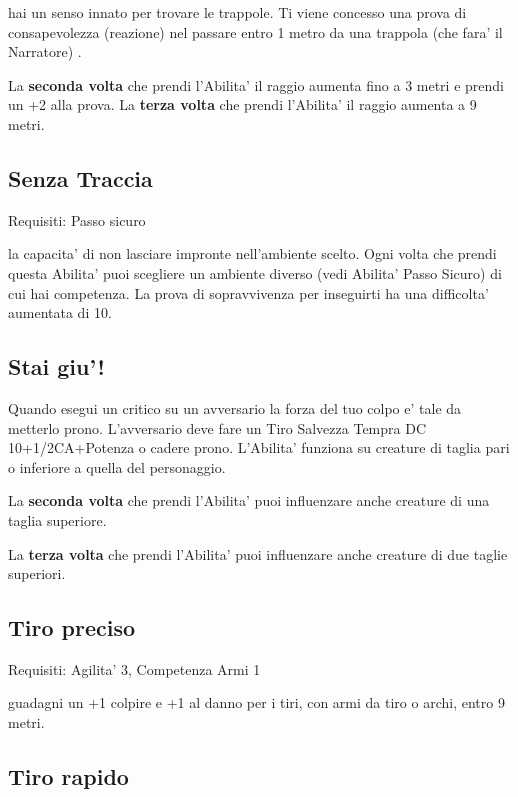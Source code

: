 \documentclass[a4paper,11pt,twoside,openany]{book}
\begin{document}
	hai un senso innato per trovare le trappole. Ti viene concesso una prova di consapevolezza (reazione) nel passare entro 1 metro da una trappola (che fara' il Narratore) .
	
	La \textbf{seconda volta} che prendi l'Abilita' il raggio aumenta fino a 3 metri e prendi un +2 alla prova. La \textbf{terza volta} che prendi l'Abilita' il raggio aumenta a 9 metri.
	
	\subsection{Senza Traccia}
	
	Requisiti: Passo sicuro
	
	la capacita' di non lasciare impronte nell'ambiente scelto. Ogni volta che prendi questa Abilita' puoi scegliere un ambiente diverso (vedi Abilita' Passo Sicuro) di cui hai competenza. La prova di sopravvivenza per inseguirti ha una difficolta' aumentata di 10.
	
	\subsection{Stai giu'!}
	
	Quando esegui un critico su un avversario la forza del tuo colpo e' tale da metterlo prono. L'avversario deve fare un Tiro Salvezza Tempra DC 10+1/2CA+Potenza o cadere prono. L'Abilita' funziona su creature di taglia pari o inferiore a quella del personaggio.
	
	La \textbf{seconda volta} che prendi l'Abilita' puoi influenzare anche creature di una taglia superiore.
	
	La \textbf{terza volta} che prendi l'Abilita' puoi influenzare anche creature di due taglie superiori.
	
	\subsection{Tiro preciso}
	
	Requisiti: Agilita' 3, Competenza Armi 1
	
	guadagni un +1 colpire e +1 al danno per i tiri, con armi da tiro o archi, entro 9 metri.
	
	\subsection{Tiro rapido}
	
\end{document}
